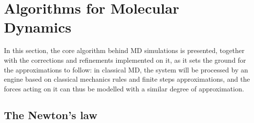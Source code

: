 \section{Algorithms for Molecular Dynamics}

In this section, the core algorithm behind MD simulations is presented, together with the corrections and refinements implemented on it, as it sets the ground for the approximations to follow:
in classical MD, the system will be processed by an engine based on classical mechanics rules and finite steps approximations, and the forces acting on it can thus be modelled with a similar degree of approximation.

\subsection{The Newton's law}

